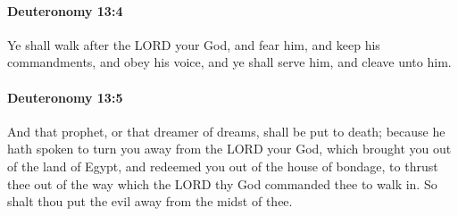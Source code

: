 		\paragraph{Deuteronomy 13:4} %
			\label{DEUTERONOMY-13-4}

			Ye shall walk after the LORD your God, and fear him, and keep his commandments, and obey his voice, and ye shall serve him, and cleave unto him.


		\paragraph{Deuteronomy 13:5} %
			\label{DEUTERONOMY-13-5}

			And that prophet, or that dreamer of dreams, shall be put to death; because he hath spoken to turn you away from the LORD your God, which brought you out of the land of Egypt, and redeemed you out of the house of bondage, to thrust thee out of the way which the LORD thy God commanded thee to walk in. So shalt thou put the evil away from the midst of thee.

